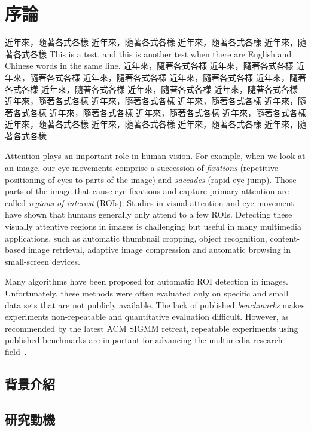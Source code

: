 \chapter{序論}
\label{c:intro}

近年來，隨著各式各樣
近年來，隨著各式各樣
近年來，隨著各式各樣
近年來，隨著各式各樣 This is a test, and this is another test when there are English and Chinese words in the same line.
近年來，隨著各式各樣
近年來，隨著各式各樣
近年來，隨著各式各樣
近年來，隨著各式各樣
近年來，隨著各式各樣
近年來，隨著各式各樣
近年來，隨著各式各樣
近年來，隨著各式各樣
近年來，隨著各式各樣
近年來，隨著各式各樣
近年來，隨著各式各樣
近年來，隨著各式各樣
近年來，隨著各式各樣
近年來，隨著各式各樣
近年來，隨著各式各樣
近年來，隨著各式各樣
近年來，隨著各式各樣
近年來，隨著各式各樣
近年來，隨著各式各樣
近年來，隨著各式各樣

Attention plays an important role in human vision. For example, when
we look at an image, our eye movements comprise a succession of {\em
fixations} (repetitive positioning of eyes to parts of the image)
and {\em saccades} (rapid eye jump). Those parts of the image that
cause eye fixations and capture primary attention are called {\em
regions of interest} (ROIs). Studies in visual attention and eye
movement have shown that humans generally only attend to a few ROIs.
Detecting these visually attentive regions in images is challenging
but useful in many multimedia applications, such as automatic
thumbnail cropping, object recognition, content-based image
retrieval, adaptive image compression and automatic browsing in
small-screen devices.

Many algorithms have been proposed for automatic ROI detection in
images. Unfortunately, these methods were often evaluated only on
specific and small data sets that are not publicly available. The
lack of published {\em benchmarks} makes experiments non-repeatable
and quantitative evaluation difficult. However, as recommended by
the latest ACM SIGMM retreat, repeatable experiments using published
benchmarks are important for advancing the multimedia research
field~\cite{Rowe:2005:ASR}.

\section{背景介紹}

\section{研究動機}

